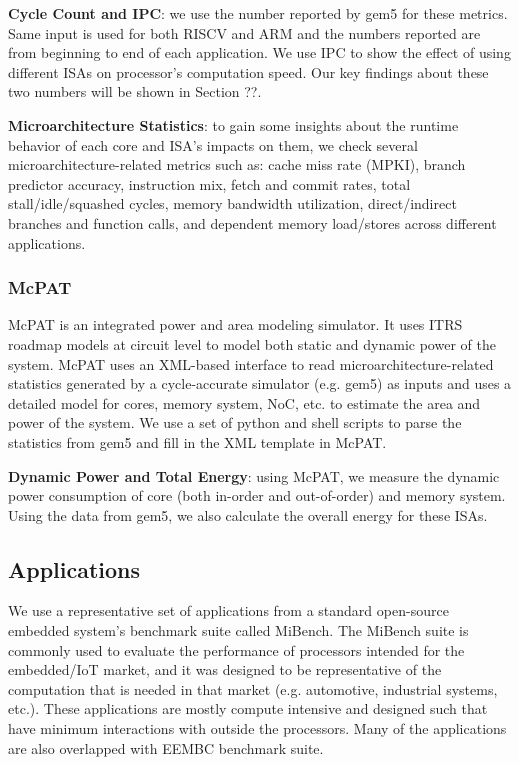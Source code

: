 \noindent \textbf{Cycle Count and IPC}: we use the number reported by gem5 for these metrics. Same input is used for both RISCV and ARM and the numbers reported are from beginning to end of each application. We use IPC to show the effect of using different ISAs on processor's computation speed. Our key findings about these two numbers will be shown in Section ??. 

\noindent \textbf{Microarchitecture Statistics}: to gain some insights about the runtime behavior of each core and ISA's impacts on them, we check several microarchitecture-related metrics such as: cache miss rate (MPKI), branch predictor accuracy, instruction mix, fetch and commit rates, total stall/idle/squashed cycles, memory bandwidth utilization, direct/indirect branches and function calls, and dependent memory load/stores across different applications. 

\subsubsection{McPAT}
McPAT is an integrated power and area modeling simulator. It uses ITRS roadmap models at circuit level to model both static and dynamic power of the system. McPAT uses an XML-based interface to read microarchitecture-related statistics generated by a cycle-accurate simulator (e.g. gem5) as inputs and uses a detailed model for cores, memory system, NoC, etc. to estimate the area and power of the system. We use a set of python and shell scripts to parse the statistics from gem5 and fill in the XML template in McPAT.  

\noindent \textbf{Dynamic Power and Total Energy}: using McPAT, we measure the dynamic power consumption of core (both in-order and out-of-order) and memory system. Using the data from gem5, we also calculate the overall energy for these ISAs.

\subsection{Applications}
We use a representative set of applications from a standard open-source embedded system's benchmark suite called MiBench. The MiBench suite is commonly used to evaluate the performance of processors intended for the embedded/IoT market, and it was designed to be representative of the computation that is needed in that market (e.g. automotive, industrial systems, etc.). These applications are mostly compute intensive and designed such that have minimum interactions with outside the processors. Many of the applications are also overlapped with EEMBC benchmark suite. 

